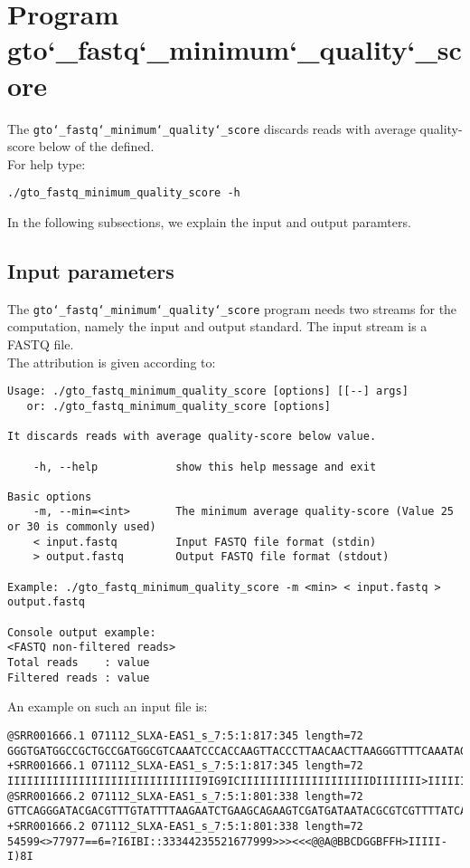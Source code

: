 \section{Program gto\char`_fastq\char`_minimum\char`_quality\char`_score}
The \texttt{gto\char`_fastq\char`_minimum\char`_quality\char`_score} discards reads with average quality-score below of the defined.\\
For help type:
\begin{lstlisting}
./gto_fastq_minimum_quality_score -h
\end{lstlisting}
In the following subsections, we explain the input and output paramters.

\subsection*{Input parameters}

The \texttt{gto\char`_fastq\char`_minimum\char`_quality\char`_score} program needs two streams for the computation, namely the input and output standard. The input stream is a FASTQ file.\\
The attribution is given according to:
\begin{lstlisting}
Usage: ./gto_fastq_minimum_quality_score [options] [[--] args]
   or: ./gto_fastq_minimum_quality_score [options]

It discards reads with average quality-score below value.

    -h, --help            show this help message and exit

Basic options
    -m, --min=<int>       The minimum average quality-score (Value 25 or 30 is commonly used)
    < input.fastq         Input FASTQ file format (stdin)
    > output.fastq        Output FASTQ file format (stdout)

Example: ./gto_fastq_minimum_quality_score -m <min> < input.fastq > output.fastq

Console output example:
<FASTQ non-filtered reads>
Total reads    : value
Filtered reads : value
\end{lstlisting}
An example on such an input file is:
\begin{lstlisting}
@SRR001666.1 071112_SLXA-EAS1_s_7:5:1:817:345 length=72
GGGTGATGGCCGCTGCCGATGGCGTCAAATCCCACCAAGTTACCCTTAACAACTTAAGGGTTTTCAAATAGA
+SRR001666.1 071112_SLXA-EAS1_s_7:5:1:817:345 length=72
IIIIIIIIIIIIIIIIIIIIIIIIIIIIII9IG9ICIIIIIIIIIIIIIIIIIIIIDIIIIIII>IIIIII/
@SRR001666.2 071112_SLXA-EAS1_s_7:5:1:801:338 length=72
GTTCAGGGATACGACGTTTGTATTTTAAGAATCTGAAGCAGAAGTCGATGATAATACGCGTCGTTTTATCAT
+SRR001666.2 071112_SLXA-EAS1_s_7:5:1:801:338 length=72
54599<>77977==6=?I6IBI::33344235521677999>>><<<@@A@BBCDGGBFFH>IIIII-I)8I
\end{lstlisting}

